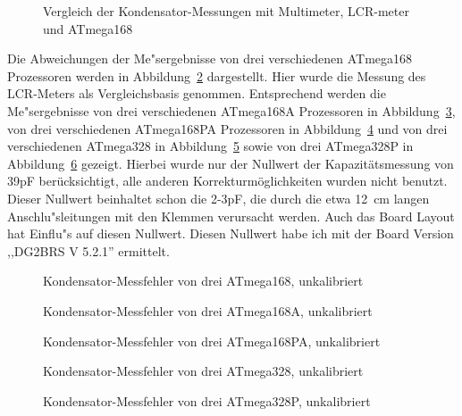 \begin{figure}[H]
\centering

\caption{Vergleich der Kondensator-Messungen mit Multimeter, LCR-meter und ATmega168}
\label{fig:capcompare}
\end{figure}

Die Abweichungen der Me"sergebnisse von drei verschiedenen ATmega168 Prozessoren werden in Abbildung~\ref{fig:mega168all} dargestellt.
Hier wurde die Messung des LCR-Meters als Vergleichsbasis genommen.
Entsprechend werden die Me"sergebnisse von drei verschiedenen ATmega168A Prozessoren in Abbildung~\ref{fig:mega168Aall}, 
von drei verschiedenen ATmega168PA Prozessoren in Abbildung~\ref{fig:mega168PAall} und von drei verschiedenen
ATmega328 in Abbildung~\ref{fig:mega328all} sowie von drei ATmega328P in Abbildung~\ref{fig:mega328Pall} gezeigt.
Hierbei wurde nur der Nullwert der Kapazit\"atsmessung von 39pF ber\"ucksichtigt, alle anderen Korrekturm\"oglichkeiten wurden
nicht benutzt. Dieser Nullwert beinhaltet schon die 2-3pF, die durch die etwa 12~cm langen Anschlu"sleitungen mit den
Klemmen verursacht werden.
Auch das Board Layout hat Einflu"s auf diesen Nullwert. Diesen Nullwert habe ich mit der Board Version ,,DG2BRS V 5.2.1'' ermittelt.

\begin{figure}[H]
\centering

\caption{Kondensator-Messfehler von drei ATmega168, unkalibriert}
\label{fig:mega168all}
\end{figure}

\begin{figure}[H]
\centering

\caption{Kondensator-Messfehler von drei ATmega168A, unkalibriert}
\label{fig:mega168Aall}
\end{figure}

\begin{figure}[H]
\centering

\caption{Kondensator-Messfehler von drei ATmega168PA, unkalibriert}
\label{fig:mega168PAall}
\end{figure}

\begin{figure}[H]
\centering

\caption{Kondensator-Messfehler von drei ATmega328, unkalibriert}
\label{fig:mega328all}
\end{figure}

\begin{figure}[H]
\centering

\caption{Kondensator-Messfehler von drei ATmega328P, unkalibriert}
\label{fig:mega328Pall}
\end{figure}

